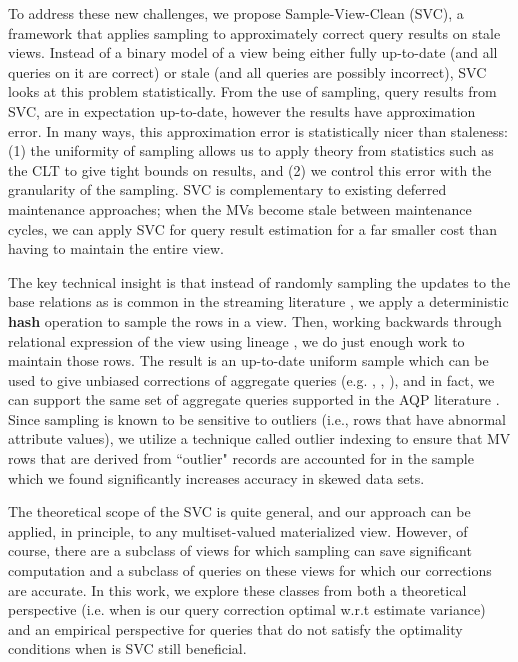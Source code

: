 To address these new challenges, we propose Sample-View-Clean (SVC), a framework that applies sampling to approximately correct query results on stale views.
Instead of a binary model of a view being either fully up-to-date (and all queries on it are correct) or stale (and all queries are possibly incorrect), SVC looks at this problem statistically.
From the use of sampling, query results from SVC, are in expectation up-to-date, however the results have approximation error.
In many ways, this approximation error is statistically nicer than staleness: (1) the uniformity of sampling allows us to apply theory from statistics such as the CLT to give tight bounds on results, and (2) we control this error with the granularity of the sampling.
SVC is complementary to existing deferred maintenance approaches; when the MVs become stale between maintenance cycles, we can apply SVC for query result estimation for a far smaller cost than having to maintain the entire view.

The key technical insight is that instead of randomly sampling the updates to the base relations as is common in the streaming literature \cite{babcock2002sampling, DBLP:journals/pvldb/MankuM12}, we apply a deterministic \textbf{hash} operation to sample the rows in a view.
Then, working backwards through relational expression of the view using lineage \cite{DBLP:journals/vldb/CuiW03}, we do just enough work to maintain those rows.
The result is an up-to-date uniform sample which can be used to give unbiased corrections of aggregate queries (e.g. \sumfunc, \countfunc, \avgfunc), and in fact, we can support the same set of aggregate queries supported in the AQP literature \cite{AgarwalMPMMS13, agarwalknowing}.
Since sampling is known to be sensitive to outliers (i.e., rows that have abnormal attribute values), we
utilize a technique called outlier indexing \cite{chaudhuri2001overcoming} to ensure that MV rows that are derived from ``outlier" records are accounted for in the sample which we found significantly increases accuracy in skewed data sets.

The theoretical scope of the SVC is quite general, and our approach can be applied, in principle, to any multiset-valued materialized view.
However, of course, there are a subclass of views for which sampling can save significant computation and a subclass of queries on these views for which our corrections are accurate.
In this work, we explore these classes from both a theoretical perspective (i.e. when is our query correction optimal w.r.t estimate variance) and an empirical perspective for queries that do not satisfy the optimality conditions when is SVC still beneficial.

